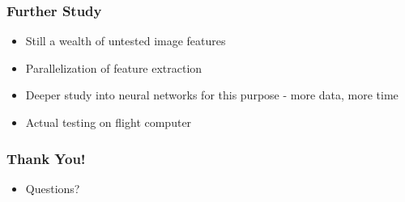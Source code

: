 \documentclass{beamer}
\begin{document}

\begin{frame}
\frametitle{Further Study}
\begin{itemize}
  \item Still a wealth of untested image features
  \item Parallelization of feature extraction
  \item Deeper study into neural networks for this purpose - more data, more time
  \item Actual testing on flight computer
\end{itemize}
\end{frame}


\begin{frame}
\frametitle{ Thank You! }
\begin{itemize}
  \item Questions?
\end{itemize}
\end{frame}
\end{document}
